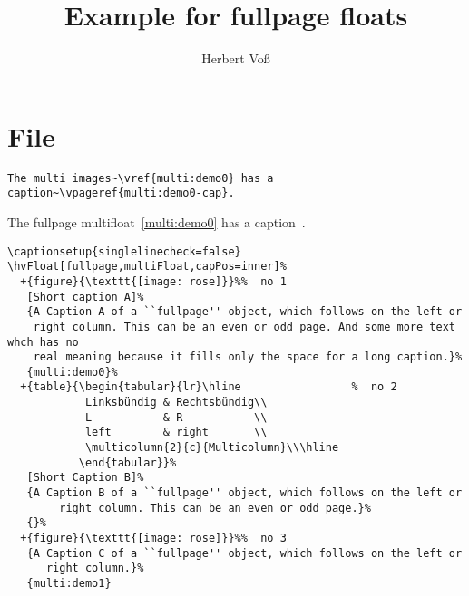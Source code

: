 \documentclass[twoside]{scrartcl}
\begin{document}
\title{Example for fullpage floats}
\author{Herbert Voß}
\maketitle

\tableofcontents

\twocolumn
\Blindtext

\section{File \texttt{\jobname}}

\begin{lstlisting}
The multi images~\vref{multi:demo0} has a caption~\vpageref{multi:demo0-cap}.
\end{lstlisting}

The fullpage multifloat~\vref{multi:demo0} has a caption~.


\begin{lstlisting}
\captionsetup{singlelinecheck=false}
\hvFloat[fullpage,multiFloat,capPos=inner]%
  +{figure}{\texttt{[image: rose]}}%%  no 1
   [Short caption A]%
   {A Caption A of a ``fullpage'' object, which follows on the left or
    right column. This can be an even or odd page. And some more text whch has no
    real meaning because it fills only the space for a long caption.}%
   {multi:demo0}%
  +{table}{\begin{tabular}{lr}\hline                 %  no 2
            Linksbündig & Rechtsbündig\\
            L           & R           \\
            left        & right       \\
            \multicolumn{2}{c}{Multicolumn}\\\hline
           \end{tabular}}%
   [Short Caption B]%
   {A Caption B of a ``fullpage'' object, which follows on the left or
        right column. This can be an even or odd page.}%
   {}%
  +{figure}{\texttt{[image: rose]}}%%  no 3
   {A Caption C of a ``fullpage'' object, which follows on the left or
      right column.}%
   {multi:demo1}
\end{lstlisting}


\Float[Multi]
\end{document}
